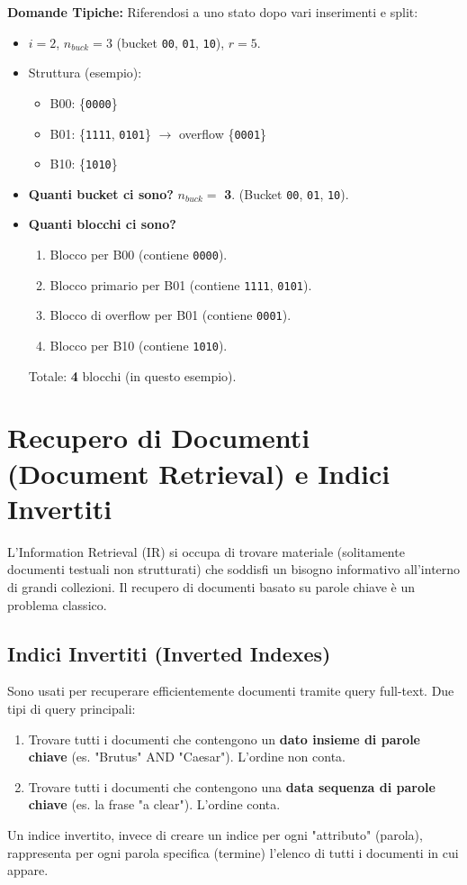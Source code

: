 \textbf{Domande Tipiche:}
Riferendosi a uno stato dopo vari inserimenti e split:
\begin{itemize}
    \item $i=2$, $n_{buck}=3$ (bucket \texttt{00}, \texttt{01}, \texttt{10}), $r=5$.
    \item Struttura (esempio):
    \begin{itemize}
        \item B00: \{\texttt{0000}\}
        \item B01: \{\texttt{1111}, \texttt{0101}\} $\rightarrow$ overflow \{\texttt{0001}\}
        \item B10: \{\texttt{1010}\}
    \end{itemize}
    \item \textbf{Quanti bucket ci sono?} $n_{buck} =$ \textbf{3}. (Bucket \texttt{00}, \texttt{01}, \texttt{10}).
    \item \textbf{Quanti blocchi ci sono?}
    \begin{enumerate}
        \item Blocco per B00 (contiene \texttt{0000}).
        \item Blocco primario per B01 (contiene \texttt{1111}, \texttt{0101}).
        \item Blocco di overflow per B01 (contiene \texttt{0001}).
        \item Blocco per B10 (contiene \texttt{1010}).
    \end{enumerate}
    Totale: \textbf{4} blocchi (in questo esempio).
\end{itemize}

\section{Recupero di Documenti (Document Retrieval) e Indici Invertiti}
L'Information Retrieval (IR) si occupa di trovare materiale (solitamente documenti testuali non strutturati) che soddisfi un bisogno informativo all'interno di grandi collezioni. Il recupero di documenti basato su parole chiave è un problema classico.

\subsection{Indici Invertiti (Inverted Indexes)}
Sono usati per recuperare efficientemente documenti tramite query full-text.
Due tipi di query principali:
\begin{enumerate}
    \item Trovare tutti i documenti che contengono un \textbf{dato insieme di parole chiave} (es. "Brutus" AND "Caesar"). L'ordine non conta.
    \item Trovare tutti i documenti che contengono una \textbf{data sequenza di parole chiave} (es. la frase "a clear"). L'ordine conta.
\end{enumerate}
Un indice invertito, invece di creare un indice per ogni "attributo" (parola), rappresenta per ogni parola specifica (termine) l'elenco di tutti i documenti in cui appare.

